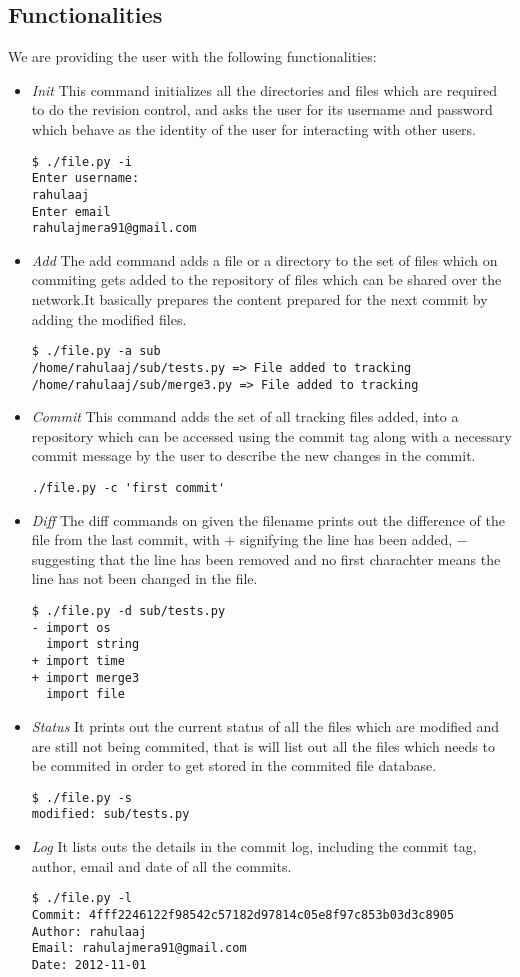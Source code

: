 \documentclass[12pt]{article}
\begin{document}
\subsection{Functionalities}
We are providing the user with the following functionalities:
\begin{itemize}
\item \emph{Init} This command initializes all the directories and files which are required to do the revision control, and asks the user for its username and password which behave as the identity of the user for interacting with other users.
\begin{lstlisting}
$ ./file.py -i
Enter username:
rahulaaj
Enter email
rahulajmera91@gmail.com
\end{lstlisting}
\item \emph{Add} The add command adds a file or a directory to the set of files which on commiting gets added to the repository of files which can be shared over the network.It basically prepares the content prepared for the next commit by adding the modified files.
\begin{lstlisting}
$ ./file.py -a sub
/home/rahulaaj/sub/tests.py => File added to tracking
/home/rahulaaj/sub/merge3.py => File added to tracking
\end{lstlisting}
\item \emph{Commit} This command adds the set of all tracking files added, into a repository which can be accessed using the commit tag along with a necessary commit message by the user to describe the new changes in the commit.
\begin{lstlisting}
./file.py -c 'first commit'
\end{lstlisting}
\item \emph{Diff} The diff commands on given the filename prints out the difference of the file from the last commit, with $+$ signifying the line has been added, $-$ suggesting that the line has been removed and no first charachter means the line has not been changed in the file.
\begin{lstlisting}
$ ./file.py -d sub/tests.py
- import os
  import string
+ import time
+ import merge3
  import file
\end{lstlisting}
\item \emph{Status} It prints out the current status of all the files which are modified and are still not being commited, that is will list out all the files which needs to be commited in order to get stored in the commited file database.
\begin{lstlisting}
$ ./file.py -s
modified: sub/tests.py
\end{lstlisting}
\item \emph{Log} It lists outs the details in the commit log, including the commit tag, author, email and date of all the commits.
\begin{lstlisting}
$ ./file.py -l
Commit: 4fff2246122f98542c57182d97814c05e8f97c853b03d3c8905
Author: rahulaaj
Email: rahulajmera91@gmail.com
Date: 2012-11-01



\end{lstlisting}
\end{itemize}
\end{document}
